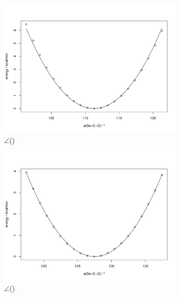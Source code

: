 \begin{refsection}
\begin{figure}
\begin{subfigure}{0.42\linewidth}
        \includegraphics[width=\linewidth]{Figures/ch2-sifig/SeCC1.pdf}
        \caption{$\angle$()}
    \end{subfigure}
    \begin{subfigure}{0.42\linewidth}
        \includegraphics[width=\linewidth]{Figures/ch2-sifig/SeCC2.pdf}
        \caption{$\angle$()}
    \end{subfigure}
    \begin{subfigure}{0.42\linewidth}

\end{subfigure}
\end{figure}
\end{refsection}
